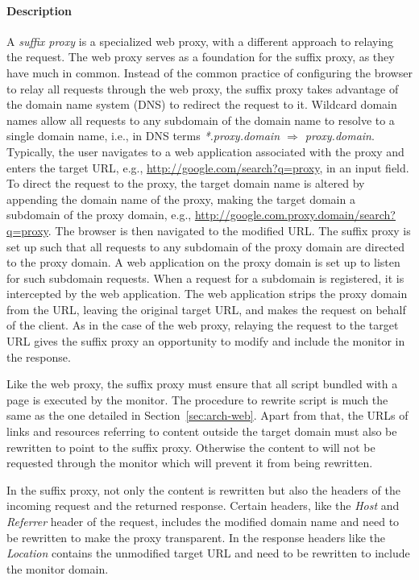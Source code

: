 \documentclass{llncs}
\begin{document}
\paragraph{Description}
A \emph{suffix proxy} is a specialized web proxy, with a different approach to relaying the request. 
The web proxy serves as a foundation for the suffix proxy, as they have much in common.
Instead of the common practice of configuring the browser to relay all requests through the web proxy,
the suffix proxy takes advantage of the domain name system (DNS) to redirect the request to it.
Wildcard domain names allow all requests to any subdomain of the domain name to resolve to a single domain name, 
i.e., in DNS terms \emph{*.proxy.domain $\Rightarrow$ proxy.domain}.
Typically, the user navigates to a 
web application associated with the proxy and enters the target URL, e.g., \url{http://google.com/search?q=proxy}, in 
an input field. To direct the request to the proxy, the target domain name is altered
by appending the domain name of the proxy, making the target domain a subdomain of the proxy domain, e.g., \url{http://google.com.proxy.domain/search?q=proxy}. 
The browser is then navigated to the modified URL.
The suffix proxy is set up such
that all requests to any subdomain of the proxy domain are directed to the proxy domain. 
A web application on the proxy domain is set up to listen for such subdomain requests.
When a request for a subdomain is registered, it is intercepted by the web application.
The web application strips the proxy domain from the URL, leaving the original target URL, 
and makes the request on behalf of the client. As in the case of the web proxy, 
relaying the request to the target URL gives the suffix proxy an opportunity to modify and 
include the monitor in the response.

Like the web proxy, the suffix proxy must ensure that all script bundled with a 
page is executed by the monitor. The procedure to rewrite script is much the same as the one
detailed in Section~\ref{sec:arch-web}. Apart from that, the URLs of links and 
resources referring to content outside the target domain must also be rewritten to point to the suffix proxy. 
Otherwise the content to will not be requested through the monitor which will 
prevent it from being rewritten.


In the suffix proxy, not only the content is rewritten
but also the headers of the incoming request and the returned response.
Certain headers, like the \emph{Host} and \emph{Referrer} header of the request, includes the 
modified domain name and need to be rewritten to make the proxy transparent. In 
the response headers like the \emph{Location} contains the unmodified target URL and 
need to be rewritten to include the monitor domain. 
\end{document}
